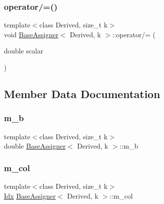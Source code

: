 \mbox{\label{structBaseAssigner_a3a85001691ad53ebf55de7de7d823b14}} 
\subsubsection{\texorpdfstring{operator/=()}{operator/=()}}
{\footnotesize\ttfamily template$<$class Derived, size\+\_\+t k$>$ \\
void \hyperlink{structBaseAssigner}{Base\+Assigner}$<$ Derived, k $>$\+::operator/= (\begin{DoxyParamCaption}\item[{double}]{scalar }\end{DoxyParamCaption})\hspace{0.3cm}{\ttfamily [inline]}}



\subsection{Member Data Documentation}
\mbox{\label{structBaseAssigner_abb635ee3585045c12214aa0fe4fdfcde}} 
\subsubsection{\texorpdfstring{m\+\_\+b}{m\_b}}
{\footnotesize\ttfamily template$<$class Derived, size\+\_\+t k$>$ \\
double \hyperlink{structBaseAssigner}{Base\+Assigner}$<$ Derived, k $>$\+::m\+\_\+b\hspace{0.3cm}{\ttfamily [protected]}}

\mbox{\label{structBaseAssigner_af1bd9c6e8db4988669a206aa9df728c4}} 
\subsubsection{\texorpdfstring{m\+\_\+col}{m\_col}}
{\footnotesize\ttfamily template$<$class Derived, size\+\_\+t k$>$ \\
\hyperlink{Includes_8h_ae78891cd308078a2f5f9e7193065c805}{Idx} \hyperlink{structBaseAssigner}{Base\+Assigner}$<$ Derived, k $>$\+::m\+\_\+col\hspace{0.3cm}{\ttfamily [protected]}}

